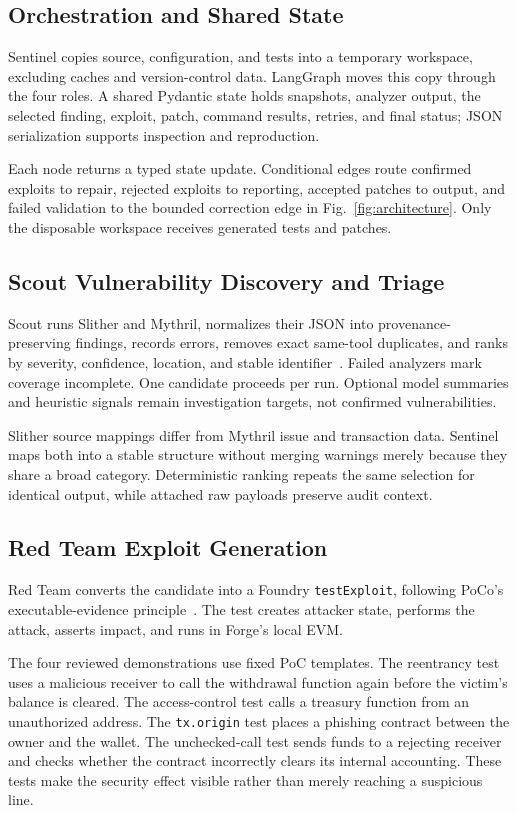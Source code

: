 \documentclass[conference,a4paper,10pt]{IEEEtran}
\newcommand{\code}[1]{\texttt{#1}}
\begin{document}
\subsection{Orchestration and Shared State}
Sentinel copies source, configuration, and tests into a temporary workspace, excluding caches and version-control data. LangGraph moves this copy through the four roles. A shared Pydantic state holds snapshots, analyzer output, the selected finding, exploit, patch, command results, retries, and final status; JSON serialization supports inspection and reproduction.

Each node returns a typed state update. Conditional edges route confirmed exploits to repair, rejected exploits to reporting, accepted patches to output, and failed validation to the bounded correction edge in Fig.~\ref{fig:architecture}. Only the disposable workspace receives generated tests and patches.

\subsection{Scout Vulnerability Discovery and Triage}
Scout runs Slither and Mythril, normalizes their JSON into provenance-preserving findings, records errors, removes exact same-tool duplicates, and ranks by severity, confidence, location, and stable identifier~\cite{slither,mpro}. Failed analyzers mark coverage incomplete. One candidate proceeds per run. Optional model summaries and heuristic signals remain investigation targets, not confirmed vulnerabilities.

Slither source mappings differ from Mythril issue and transaction data. Sentinel maps both into a stable structure without merging warnings merely because they share a broad category. Deterministic ranking repeats the same selection for identical output, while attached raw payloads preserve audit context.

\subsection{Red Team Exploit Generation}
Red Team converts the candidate into a Foundry \code{testExploit}, following PoCo's executable-evidence principle~\cite{poco}. The test creates attacker state, performs the attack, asserts impact, and runs in Forge's local EVM.

The four reviewed demonstrations use fixed PoC templates. The reentrancy test uses a malicious receiver to call the withdrawal function again before the victim's balance is cleared. The access-control test calls a treasury function from an unauthorized address. The \code{tx.origin} test places a phishing contract between the owner and the wallet. The unchecked-call test sends funds to a rejecting receiver and checks whether the contract incorrectly clears its internal accounting. These tests make the security effect visible rather than merely reaching a suspicious line.
\end{document}
